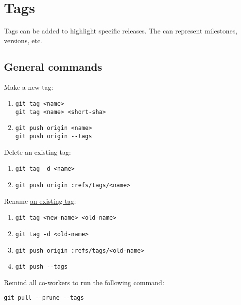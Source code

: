 \documentclass{report}
\begin{document}
\chapter{Tags}
Tags can be added to highlight specific releases. The can represent milestones, versions, etc.

\section{General commands}

Make a new tag:
\begin{enumerate}[noitemsep]
    \item
    \begin{verbatim}
git tag <name>
git tag <name> <short-sha>
    \end{verbatim}
    \item
    \begin{verbatim}
git push origin <name>
git push origin --tags
    \end{verbatim}
\end{enumerate}

Delete an existing tag:
\begin{enumerate}[noitemsep]
    \item 
    \begin{verbatim}
git tag -d <name>
    \end{verbatim}
    \item
    \begin{verbatim}
git push origin :refs/tags/<name>
    \end{verbatim}
\end{enumerate}

Rename \href{https://stackoverflow.com/questions/1028649/how-do-you-rename-a-git-tag}{an existing tag}:
\begin{enumerate}[noitemsep]
    \item 
    \begin{verbatim}
git tag <new-name> <old-name>
    \end{verbatim}
    \item
    \begin{verbatim}
git tag -d <old-name>
    \end{verbatim}
    \item
    \begin{verbatim}
git push origin :refs/tags/<old-name>
    \end{verbatim}
    \item
    \begin{verbatim}
git push --tags
    \end{verbatim}
\end{enumerate}

Remind all co-workers to run the following command:
\begin{verbatim}
git pull --prune --tags
\end{verbatim}
\end{document}
